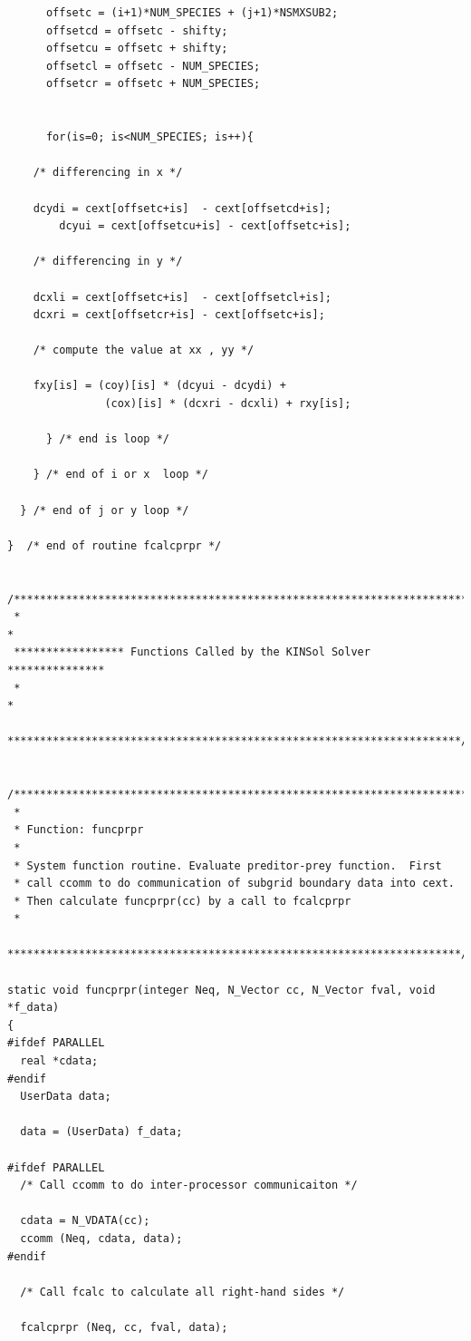 \documentclass[11pt]{article}
\begin{document}
\begin{verbatim}
      offsetc = (i+1)*NUM_SPECIES + (j+1)*NSMXSUB2;
      offsetcd = offsetc - shifty;
      offsetcu = offsetc + shifty;
      offsetcl = offsetc - NUM_SPECIES;
      offsetcr = offsetc + NUM_SPECIES;


      for(is=0; is<NUM_SPECIES; is++){

	/* differencing in x */

	dcydi = cext[offsetc+is]  - cext[offsetcd+is];
        dcyui = cext[offsetcu+is] - cext[offsetc+is];

	/* differencing in y */

	dcxli = cext[offsetc+is]  - cext[offsetcl+is];
	dcxri = cext[offsetcr+is] - cext[offsetc+is];

	/* compute the value at xx , yy */

	fxy[is] = (coy)[is] * (dcyui - dcydi) +
	           (cox)[is] * (dcxri - dcxli) + rxy[is];

      } /* end is loop */

    } /* end of i or x  loop */

  } /* end of j or y loop */

}  /* end of routine fcalcprpr */


/***********************************************************************
 *                                                                     *
 ***************** Functions Called by the KINSol Solver ***************
 *                                                                     *
 **********************************************************************/


/***********************************************************************
 *
 * Function: funcprpr
 *
 * System function routine. Evaluate preditor-prey function.  First
 * call ccomm to do communication of subgrid boundary data into cext.
 * Then calculate funcprpr(cc) by a call to fcalcprpr
 *
 **********************************************************************/

static void funcprpr(integer Neq, N_Vector cc, N_Vector fval, void *f_data)
{
#ifdef PARALLEL
  real *cdata;
#endif
  UserData data;

  data = (UserData) f_data;

#ifdef PARALLEL
  /* Call ccomm to do inter-processor communicaiton */

  cdata = N_VDATA(cc);
  ccomm (Neq, cdata, data);
#endif

  /* Call fcalc to calculate all right-hand sides */

  fcalcprpr (Neq, cc, fval, data);


\end{verbatim}
\end{document}
